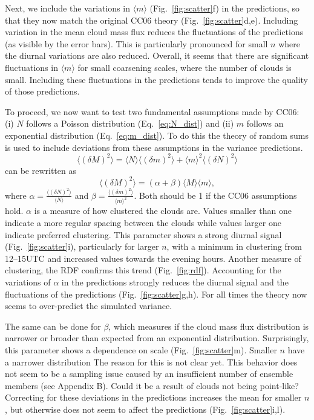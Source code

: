 \documentclass[a4paper, 12pt]{article}
\begin{document}
Next, we include the variations in $\langle m \rangle$ (Fig.~\ref{fig:scatter}f) in the predictions, so that they now match the original CC06 theory (Fig.~\ref{fig:scatter}d,e). Including variation in the mean cloud mass flux reduces the fluctuations of the predictions (as visible by the error bars). This is particularly pronounced for small $n$ where the diurnal variations are also reduced. Overall, it seems that there are significant fluctuations in $\langle m \rangle$ for small coarsening scales, where the number of clouds is small. Including these fluctuations in the predictions tends to improve the quality of those predictions. 

To proceed, we now want to test two fundamental assumptions made by CC06: (i) $N$ follows a Poisson distribution (Eq.~\ref{eq:N_dist}) and (ii) $m$ follows an exponential distribution (Eq.~\ref{eq:m_dist}). To do this the theory of random sums \citep{Taylor1998} is used to include deviations from these assumptions in the variance predictions.
\begin{equation} \label{eq:derivation_1}
 \langle (\delta M)^2 \rangle = \langle N \rangle \langle (\delta m)^2 \rangle + \langle m \rangle^2 \langle (\delta N)^2 \rangle
\end{equation}
can be rewritten as
\begin{equation} \label{eq:alpha_beta}
 \langle (\delta M)^2 \rangle= (\alpha + \beta) \langle M \rangle \langle m \rangle,
\end{equation}
where $\alpha = \frac{\langle (\delta N)^2 \rangle}{\langle N \rangle}$ and $\beta = \frac{\langle (\delta m)^2 \rangle}{\langle m \rangle^2}$. Both should be 1 if the CC06 assumptions hold. $\alpha$ is a measure of how clustered the clouds are. Values smaller than one indicate a more regular spacing between the clouds while values larger one indicate preferred clustering. This parameter shows a strong diurnal signal (Fig.~\ref{fig:scatter}i), particularly for larger $n$, with a minimum in clustering from 12--15UTC and increased values towards the evening hours. Another measure of clustering, the RDF confirms this trend (Fig.~\ref{fig:rdf}). Accounting for the variations of $\alpha$ in the predictions strongly reduces the diurnal signal and the fluctuations of the predictions (Fig.~\ref{fig:scatter}g,h). For all times the theory now seems to over-predict the simulated variance.

The same can be done for $\beta$, which measures if the cloud mass flux distribution is narrower or broader than expected from an exponential distribution. Surprisingly, this parameter shows a dependence on scale (Fig.~\ref{fig:scatter}m). Smaller $n$ have a narrower distribution The reason for this is not clear yet. This behavior does not seem to be a sampling issue caused by an insufficient number of ensemble members (see Appendix B). Could it be a result of clouds not being point-like? Correcting for these deviations in the predictions increases the mean for smaller $n$, but otherwise does not seem to affect the predictions (Fig.~\ref{fig:scatter}i,l).
\end{document}
